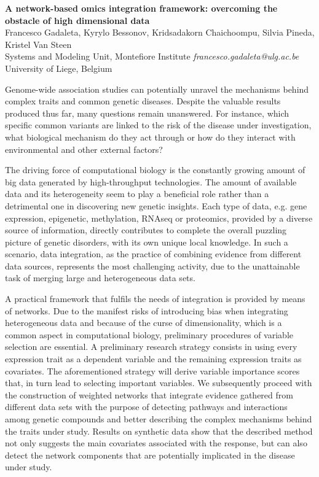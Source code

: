 \documentclass[12pt]{article}
\begin{document}
\pagestyle{empty}
\begin{center}
{\large\bf A network-based omics integration framework:
 overcoming the obstacle of high dimensional data}
\\[3mm]
Francesco Gadaleta, Kyrylo Bessonov, Kridsadakorn Chaichoompu, Silvia Pineda, Kristel Van Steen
\\[5mm]
Systems and Modeling Unit, Montefiore Institute {\it francesco.gadaleta@ulg.ac.be}\\
 University of Liege, Belgium\\
\end{center}

Genome-wide association studies can potentially unravel the mechanisms behind complex traits and common genetic diseases. Despite the valuable results produced thus far, many questions remain unanswered. For instance, which specific common variants are linked to the risk of
the disease under investigation, what biological mechanism do they act through or how do they interact with environmental and other external
factors? 

The driving force of computational biology is the constantly growing amount of big data generated by high-throughput technologies. The amount of available data and its heterogeneity seem to play a beneficial role rather than a detrimental one in discovering new genetic insights. Each type of data, e.g. gene expression, epigenetic, methylation, RNAseq or proteomics, provided by a diverse source of information, directly contributes to complete the overall puzzling picture of genetic disorders, with its own unique local knowledge. In such a scenario, data integration, as the practice of combining evidence from different data sources, represents the most challenging activity, due to the unattainable task of merging large and heterogeneous data sets.

A practical framework that fulfils the needs of integration is provided by means of networks. Due to the manifest risks of introducing bias when integrating heterogeneous data and because of the curse of dimensionality, which is a common aspect in computational biology, preliminary procedures of variable selection are essential. 
A preliminary research strategy consists in using every expression trait as a dependent variable and the remaining expression traits as covariates. The aforementioned strategy will derive variable importance scores that, in turn lead to selecting important variables. We subsequently proceed with the construction of weighted networks that integrate evidence gathered from different data sets with the purpose of detecting pathways and interactions among genetic compounds and better describing the complex mechanisms behind the traits under study.
Results on synthetic data show that the described method not only suggests the main covariates associated with the response, but can also detect the network components that are potentially implicated in the disease under study.
\end{document}
